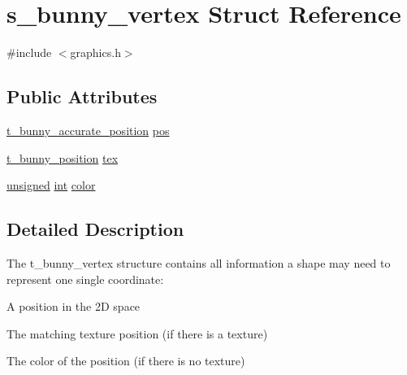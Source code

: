 \hypertarget{structs__bunny__vertex}{\section{s\-\_\-bunny\-\_\-vertex Struct Reference}
\label{structs__bunny__vertex}
}


{\ttfamily \#include $<$graphics.\-h$>$}

\subsection*{Public Attributes}
\begin{DoxyCompactItemize}
\item 
\hyperlink{placement_8h_a0871582e90d8efb086973027e2732c21}{t\-\_\-bunny\-\_\-accurate\-\_\-position} \hyperlink{structs__bunny__vertex_aa0cd5bd0ea037e46c986cf03ce5d481d}{pos}
\item 
\hyperlink{placement_8h_ac188709ed3c01e1ec071dd6c19bb1499}{t\-\_\-bunny\-\_\-position} \hyperlink{structs__bunny__vertex_acbd15cb3c2721d5bae73f5e8f23ec28e}{tex}
\item 
\hyperlink{curses_8priv_8h_aca40206900cfc164654362fa8d4ad1e6}{unsigned} \hyperlink{term__entry_8h_ad65b480f8c8270356b45a9890f6499ae}{int} \hyperlink{structs__bunny__vertex_aefec2984840ed9aa7467cd08213e041d}{color}
\end{DoxyCompactItemize}


\subsection{Detailed Description}
The t\-\_\-bunny\-\_\-vertex structure contains all information a shape may need to represent one single coordinate\-:
\begin{DoxyItemize}
\item A position in the 2\-D space
\item The matching texture position (if there is a texture)
\item The color of the position (if there is no texture) 
\end{DoxyItemize}

